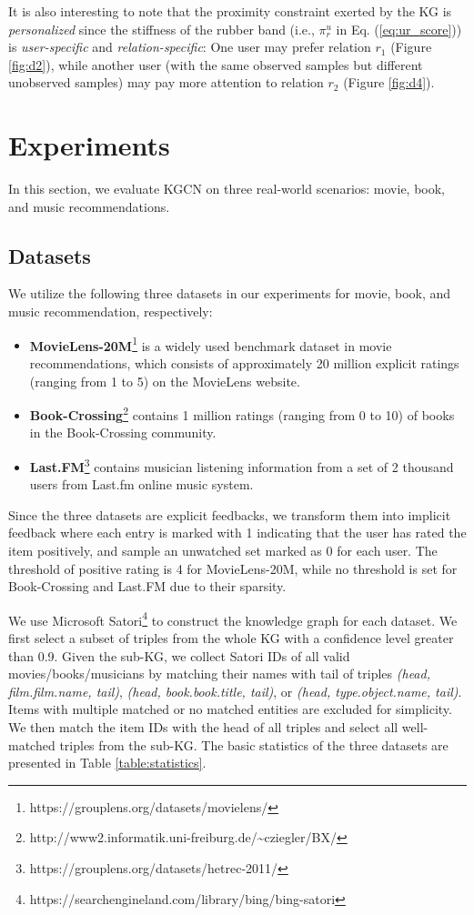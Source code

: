 \documentclass[sigconf]{acmart}
\begin{document}
		It is also interesting to note that the proximity constraint exerted by the KG is \textit{personalized} since the stiffness of the rubber band (i.e., $\pi_r^u$ in Eq. (\ref{eq:ur_score})) is \textit{user-specific} and \textit{relation-specific}:
		One user may prefer relation $r_1$ (Figure \ref{fig:d2}), while another user (with the same observed samples but different unobserved samples) may pay more attention to relation $r_2$ (Figure \ref{fig:d4}).
		\fi		
		

			
\section{Experiments}
	In this section, we evaluate KGCN on three real-world scenarios: movie, book, and music recommendations.
	
	\subsection{Datasets}
		We utilize the following three datasets in our experiments for movie, book, and music recommendation, respectively:
		\begin{itemize}
			\item
				\textbf{MovieLens-20M}\footnote{https://grouplens.org/datasets/movielens/} is a widely used benchmark dataset in movie recommendations, which consists of approximately 20 million explicit ratings (ranging from 1 to 5) on the MovieLens website.
			\item
				\textbf{Book-Crossing}\footnote{http://www2.informatik.uni-freiburg.de/\textasciitilde cziegler/BX/} contains 1 million ratings (ranging from 0 to 10) of books in the Book-Crossing community.
			\item
				\textbf{Last.FM}\footnote{https://grouplens.org/datasets/hetrec-2011/} contains musician listening information from a set of 2 thousand users from Last.fm online music system.
		\end{itemize}
		
		Since the three datasets are explicit feedbacks, we transform them into implicit feedback where each entry is marked with 1 indicating that the user has rated the item positively, and sample an unwatched set marked as 0 for each user.
		The threshold of positive rating is 4 for MovieLens-20M, while no threshold is set for Book-Crossing and Last.FM due to their sparsity.
		
		We use Microsoft Satori\footnote{https://searchengineland.com/library/bing/bing-satori} to construct the knowledge graph for each dataset.
		We first select a subset of triples from the whole KG with a confidence level greater than 0.9.
		Given the sub-KG, we collect Satori IDs of all valid movies/books/musicians by matching their names with tail of triples \textit{(head, film.film.name, tail)}, \textit{(head, book.book.title, tail)}, or \textit{(head, type.object.name, tail)}.
		Items with multiple matched or no matched entities are excluded for simplicity.
		We then match the item IDs with the head of all triples and select all well-matched triples from the sub-KG.
		The basic statistics of the three datasets are presented in Table \ref{table:statistics}.
		
\end{document}
